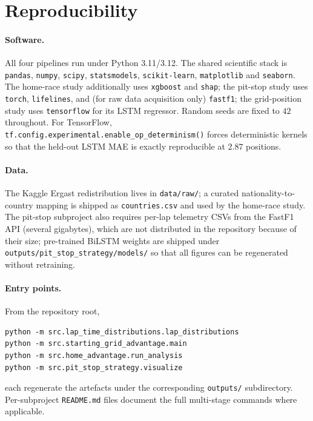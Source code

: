 \documentclass[11pt,a4paper]{article}
\newcommand{\code}[1]{\texttt{\small #1}}
\theoremstyle{remark}
\begin{document}
\appendix
\section{Reproducibility}

\paragraph{Software.}
All four pipelines run under Python 3.11/3.12. The shared scientific
stack is \code{pandas}, \code{numpy}, \code{scipy},
\code{statsmodels}, \code{scikit-learn}, \code{matplotlib} and
\code{seaborn}. The home-race study additionally uses \code{xgboost}
and \code{shap}; the pit-stop study uses \code{torch},
\code{lifelines}, and (for raw data acquisition only) \code{fastf1};
the grid-position study uses \code{tensorflow} for its LSTM
regressor. Random seeds are fixed to $42$ throughout. For TensorFlow,
\code{tf.config.experimental.enable\_op\_determinism()} forces
deterministic kernels so that the held-out LSTM MAE is exactly
reproducible at $2.87$ positions.

\paragraph{Data.}
The Kaggle Ergast redistribution lives in \code{data/raw/}; a curated
nationality-to-country mapping is shipped as \code{countries.csv}
and used by the home-race study. The pit-stop subproject also requires
per-lap telemetry CSVs from the FastF1 API (several gigabytes), which
are not distributed in the repository because of their size;
pre-trained BiLSTM weights are shipped under
\code{outputs/pit\_stop\_strategy/models/} so that all figures can be
regenerated without retraining.

\paragraph{Entry points.}
From the repository root,
\begin{verbatim}
python -m src.lap_time_distributions.lap_distributions
python -m src.starting_grid_advantage.main
python -m src.home_advantage.run_analysis
python -m src.pit_stop_strategy.visualize
\end{verbatim}
each regenerate the artefacts under the corresponding
\code{outputs/} subdirectory. Per-subproject \code{README.md} files
document the full multi-stage commands where applicable.
\end{document}
